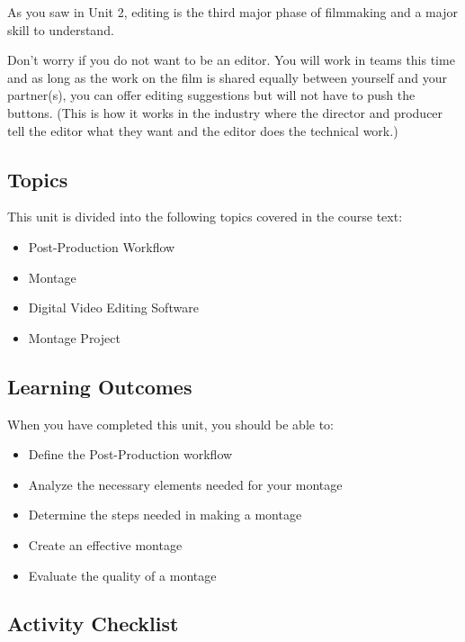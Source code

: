\documentclass[
]{book}
\providecommand{\tightlist}{%
  \setlength{\itemsep}{0pt}\setlength{\parskip}{0pt}}
\begin{document}
As you saw in Unit 2, editing is the third major phase of filmmaking and a major skill to understand.

Don't worry if you do not want to be an editor. You will work in teams this time and as long as the work on the film is shared equally between yourself and your partner(s), you can offer editing suggestions but will not have to push the buttons. (This is how it works in the industry where the director and producer tell the editor what they want and the editor does the technical work.)

\hypertarget{topics-6}{%
\subsection*{Topics}\label{topics-6}}

This unit is divided into the following topics covered in the course text:

\begin{itemize}
\tightlist
\item
  Post-Production Workflow
\item
  Montage
\item
  Digital Video Editing Software
\item
  Montage Project
\end{itemize}

\hypertarget{learning-outcomes-6}{%
\subsection*{Learning Outcomes}\label{learning-outcomes-6}}

When you have completed this unit, you should be able to:

\begin{itemize}
\tightlist
\item
  Define the Post-Production workflow
\item
  Analyze the necessary elements needed for your montage
\item
  Determine the steps needed in making a montage
\item
  Create an effective montage
\item
  Evaluate the quality of a montage
\end{itemize}

\hypertarget{activity-checklist-6}{%
\subsection*{Activity Checklist}\label{activity-checklist-6}}
\end{document}
